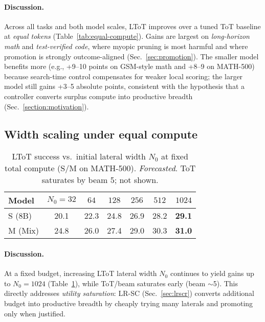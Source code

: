 \documentclass{article}
\begin{document}
\paragraph{Discussion.}
Across all tasks and both model scales, LToT improves over a tuned ToT baseline at \emph{equal tokens} (Table~\ref{tab:equal-compute}).
Gains are largest on \emph{long-horizon math} and \emph{test-verified code}, where myopic pruning is most harmful and where promotion is strongly outcome-aligned (Sec.~\ref{sec:promotion}).
The smaller model benefits more (e.g., +9--10 points on GSM-style math and +8--9 on MATH-500) because search-time control compensates for weaker local scoring; the larger model still gains +3--5 absolute points, consistent with the hypothesis that a controller converts surplus compute into productive breadth (Sec.~\ref{section:motivation}).

\subsection{Width scaling under equal compute}
\label{subsec:width-scaling}

\begin{table}[t]
\centering
\caption{LToT success vs.\ initial lateral width $N_0$ at fixed total compute (S/M on MATH-500). \emph{Forecasted}. ToT saturates by beam 5; not shown.}
\vspace{0.3em}
\begin{tabular}{lcccccc}
\toprule
\textbf{Model} & $N_0{=}32$ & $64$ & $128$ & $256$ & $512$ & $1024$ \\
\midrule
S (8B)   & 20.1 & 22.3 & 24.8 & 26.9 & 28.2 & \textbf{29.1} \\
M (Mix)  & 24.8 & 26.0 & 27.4 & 29.0 & 30.3 & \textbf{31.0} \\
\bottomrule
\end{tabular}
\label{tab:width-scaling}
\end{table}

\paragraph{Discussion.}
At a fixed budget, increasing LToT lateral width $N_0$ continues to yield gains up to $N_0{=}1024$ (Table~\ref{tab:width-scaling}), while ToT/beam saturates early (beam $\sim$5).
This directly addresses \emph{utility saturation}: LR-SC (Sec.~\ref{sec:lrscr}) converts additional budget into productive breadth by cheaply trying many laterals and promoting only when justified.
\end{document}
